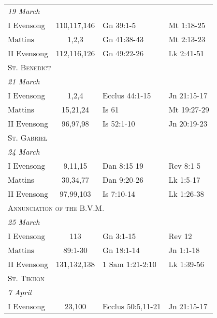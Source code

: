 \begin{longtable}{l c l l}
\multicolumn{4}{l}{\textit{19 March}}\\
\hspace{1em} I Evensong&110,117,146&Gn 39:1-5&Mt 1:18-25\\
\hspace{1em} Mattins&1,2,3&Gn 41:38-43&Mt 2:13-23\\
\hspace{1em} II Evensong&112,116,126&Gn 49:22-26&Lk 2:41-51\\
\multicolumn{4}{l}{\textsc{St. Benedict}}\\
\multicolumn{4}{l}{\textit{21 March}}\\
\hspace{1em} I Evensong&1,2,4&Ecclus 44:1-15&Jn 21:15-17\\
\hspace{1em} Mattins&15,21,24&Is 61&Mt 19:27-29\\
\hspace{1em} II Evensong&96,97,98&Is 52:1-10&Jn 20:19-23\\
%
\multicolumn{4}{l}{\textsc{St. Gabriel}}\\
\multicolumn{4}{l}{\textit{24 March}}\\
\hspace{1em} I Evensong&9,11,15&Dan 8:15-19&Rev 8:1-5\\
\hspace{1em} Mattins&30,34,77&Dan 9:20-26&Lk 1:5-17\\
\hspace{1em} II Evensong&97,99,103&Is 7:10-14&Lk 1:26-38\\
%
\multicolumn{4}{l}{\textsc{Annunciation of the B.V.M.}}\\
\multicolumn{4}{l}{\textit{25 March}}\\
\hspace{1em} I Evensong&113&Gn 3:1-15&Rev 12\\
\hspace{1em} Mattins&89:1-30&Gn 18:1-14&Jn 1:1-18\\
\hspace{1em} II Evensong&131,132,138&1 Sam 1:21-2:10&Lk 1:39-56\\
\multicolumn{4}{l}{\textsc{St. Tikhon}}\\
\multicolumn{4}{l}{\textit{7 April}}\\
\hspace{1em} I Evensong&23,100&Ecclus 50:5,11-21&Jn 21:15-17\\

\end{longtable}

